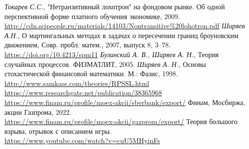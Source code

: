 \begin{thebibliography}{9}
 {\it Токарев С.С.}, {"Нетранзитивный лохотрон" на фондовом рынке. Об одной перспективной форме платного обучения экономике, 2009.}\\
\href{http://cdn.scipeople.ru/materials/14103/Nontransitive%20lohotron.pdf}{http://cdn.scipeople.ru/materials/14103/Nontransitive\%20lohotron.pdf}
 {\it Ширяев А.Н.}, О мартингальных методах в задачах о пересечении границ броуновским движением, Совр. пробл. матем., 2007, выпуск 8, 3–78. \\
{\href{https://doi.org/10.4213/spm11}{https://doi.org/10.4213/spm11}}
 {\it Булинский А. В., Ширяев А. Н.}, Теория случайных процессов. ФИЗМАТЛИТ, 2005.
 {\it Ширяев А. Н.}, Основы стохастической финансовой математики. М.: Фазис, 1998. 
 \\
{\href{http://www.samkass.com/theories/RPSSL.html}{http://www.samkass.com/theories/RPSSL.html}}
\\
\href{https://www.researchgate.net/publication/38365968_Max-Min_Probabilities_in_the_Voting_Paradox}{https://www.researchgate.net/publication/38365968}
 \\
\href{https://www.finam.ru/profile/moex-akcii/sberbank/export/}{https://www.finam.ru/profile/moex-akcii/sberbank/export/}
 {Финам, Мосбиржа, акции Газпрома, 2022.} \\
\href{https://www.finam.ru/profile/moex-akcii/gazprom/export/}{https://www.finam.ru/profile/moex-akcii/gazprom/export/}
 {Теория большого взрыва, отрывок с описанием игры.}\\
\href{https://www.youtube.com/watch?v=cuU5MHyinFs}{https://www.youtube.com/watch?v=cuU5MHyinFs}
\end{thebibliography}